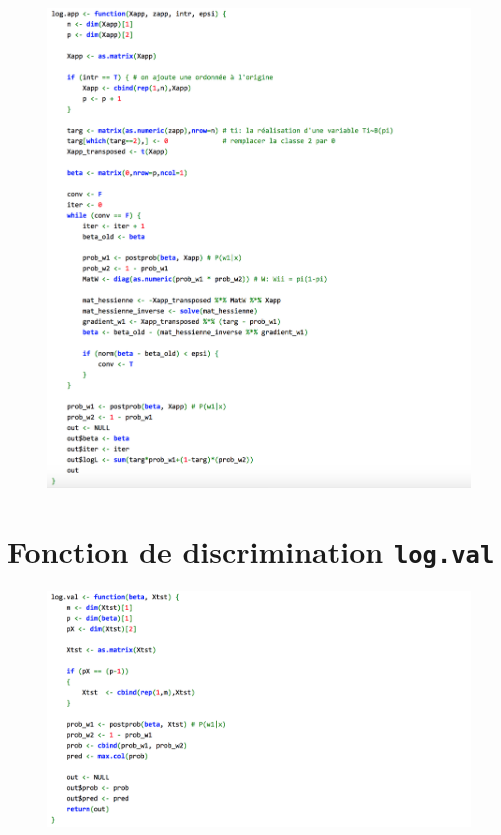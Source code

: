 \documentclass[a4paper,10pt]{report}
\begin{document}
\begin{figure}[H]
	\centering
	\captionsetup{justification=centering, margin=3cm}
	\includegraphics[width=0.9\linewidth]{img/B-log-app-function}
	\label{fig:B-log-app-function}
\end{figure}

\section{Fonction de discrimination \texttt{log.val}}
\label{appendix:functions-reg-log-simple-val}

\begin{figure}[H]
	\centering
	\captionsetup{justification=centering, margin=3cm}
	\includegraphics[width=0.9\linewidth]{img/B-log-val-function}
	\label{fig:B-log-val-function}
\end{figure}
\end{document}
